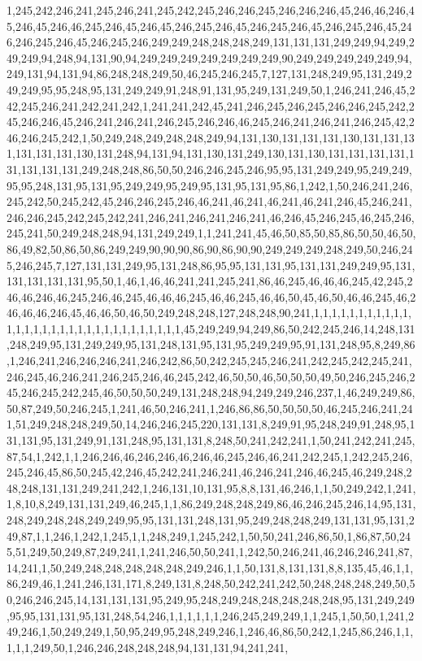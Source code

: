 1,245,242,246,241,245,246,241,245,242,245,246,246,245,246,246,246,45,246,46,246,45,246,45,246,46,245,246,45,246,45,246,245,246,45,246,245,246,45,246,245,246,45,246,246,245,246,45,246,245,246,249,249,248,248,248,249,131,131,131,249,249,94,249,249,249,94,248,94,131,90,94,249,249,249,249,249,249,249,90,249,249,249,249,249,94,249,131,94,131,94,86,248,248,249,50,46,245,246,245,7,127,131,248,249,95,131,249,249,249,95,95,248,95,131,249,249,91,248,91,131,95,249,131,249,50,1,246,241,246,45,242,245,246,241,242,241,242,1,241,241,242,45,241,246,245,246,245,246,246,245,242,245,246,246,45,246,241,246,241,246,245,246,246,46,245,246,241,246,241,246,245,42,246,246,245,242,1,50,249,248,249,248,248,249,94,131,130,131,131,131,130,131,131,131,131,131,131,130,131,248,94,131,94,131,130,131,249,130,131,130,131,131,131,131,131,131,131,131,249,248,248,86,50,50,246,246,245,246,95,95,131,249,249,95,249,249,95,95,248,131,95,131,95,249,249,95,249,95,131,95,131,95,86,1,242,1,50,246,241,246,245,242,50,245,242,45,246,246,245,246,46,241,46,241,46,241,46,241,246,45,246,241,246,246,245,242,245,242,241,246,241,246,241,246,241,46,246,45,246,245,46,245,246,245,241,50,249,248,248,94,131,249,249,1,1,241,241,45,46,50,85,50,85,86,50,50,46,50,86,49,82,50,86,50,86,249,249,90,90,90,86,90,86,90,90,249,249,249,248,249,50,246,245,246,245,7,127,131,131,249,95,131,248,86,95,95,131,131,95,131,131,249,249,95,131,131,131,131,131,95,50,1,46,1,46,46,241,241,245,241,86,46,245,46,46,46,245,42,245,246,46,246,46,245,246,46,245,46,46,46,245,46,46,245,46,46,50,45,46,50,46,46,245,46,246,46,46,246,45,46,46,50,46,50,249,248,248,127,248,248,90,241,1,1,1,1,1,1,1,1,1,1,1,1,1,1,1,1,1,1,1,1,1,1,1,1,1,1,1,1,1,1,1,45,249,249,94,249,86,50,242,245,246,14,248,131,248,249,95,131,249,249,95,131,248,131,95,131,95,249,249,95,91,131,248,95,8,249,86,1,246,241,246,246,246,241,246,242,86,50,242,245,245,246,241,242,245,242,245,241,246,245,46,246,241,246,245,246,46,245,242,46,50,50,46,50,50,50,49,50,246,245,246,245,246,245,242,245,46,50,50,50,249,131,248,248,94,249,249,246,237,1,46,249,249,86,50,87,249,50,246,245,1,241,46,50,246,241,1,246,86,86,50,50,50,50,46,245,246,241,241,51,249,248,248,249,50,14,246,246,245,220,131,131,8,249,91,95,248,249,91,248,95,131,131,95,131,249,91,131,248,95,131,131,8,248,50,241,242,241,1,50,241,242,241,245,87,54,1,242,1,1,246,246,46,246,246,46,246,46,245,246,46,241,242,245,1,242,245,246,245,246,45,86,50,245,42,246,45,242,241,246,241,46,246,241,246,46,245,46,249,248,248,248,131,131,249,241,242,1,246,131,10,131,95,8,8,131,46,246,1,1,50,249,242,1,241,1,8,10,8,249,131,131,249,46,245,1,1,86,249,248,248,249,86,46,246,245,246,14,95,131,248,249,248,248,249,249,95,95,131,131,248,131,95,249,248,248,249,131,131,95,131,249,87,1,1,246,1,242,1,245,1,1,248,249,1,245,242,1,50,50,241,246,86,50,1,86,87,50,245,51,249,50,249,87,249,241,1,241,246,50,50,241,1,242,50,246,241,46,246,246,241,87,14,241,1,50,249,248,248,248,248,248,249,246,1,1,50,131,8,131,131,8,8,135,45,46,1,1,86,249,46,1,241,246,131,171,8,249,131,8,248,50,242,241,242,50,248,248,248,249,50,50,246,246,245,14,131,131,131,95,249,95,248,249,248,248,248,248,248,95,131,249,249,95,95,131,131,95,131,248,54,246,1,1,1,1,1,1,246,245,249,249,1,1,245,1,50,50,1,241,249,246,1,50,249,249,1,50,95,249,95,248,249,246,1,246,46,86,50,242,1,245,86,246,1,1,1,1,1,249,50,1,246,246,248,248,248,94,131,131,94,241,241,